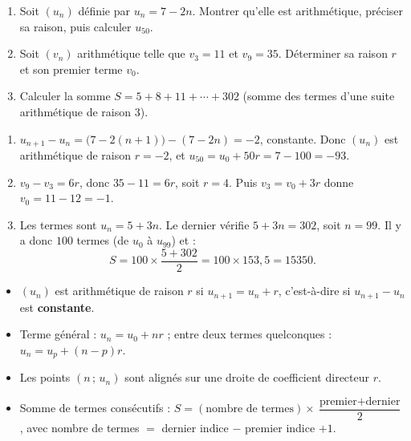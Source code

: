 \documentclass[11pt]{article}
\begin{document}
\begin{exercice}
\begin{enumerate}
\item Soit $(u_n)$ définie par $u_n = 7 - 2n$. Montrer qu'elle est arithmétique, préciser sa raison, puis calculer $u_{50}$.
\item Soit $(v_n)$ arithmétique telle que $v_3 = 11$ et $v_9 = 35$. Déterminer sa raison $r$ et son premier terme $v_0$.
\item Calculer la somme $S = 5 + 8 + 11 + \cdots + 302$ (somme des termes d'une suite arithmétique de raison $3$).
\end{enumerate}
\end{exercice}

\begin{corrige}
\begin{enumerate}
\item $u_{n+1} - u_n = \bigl(7 - 2(n+1)\bigr) - (7 - 2n) = -2$, constante. Donc $(u_n)$ est arithmétique de raison $r = -2$, et $u_{50} = u_0 + 50r = 7 - 100 = -93$.
\item $v_9 - v_3 = 6r$, donc $35 - 11 = 6r$, soit $r = 4$. Puis $v_3 = v_0 + 3r$ donne $v_0 = 11 - 12 = -1$.
\item Les termes sont $u_n = 5 + 3n$. Le dernier vérifie $5 + 3n = 302$, soit $n = 99$. Il y a donc $100$ termes (de $u_0$ à $u_{99}$) et :
\[ S = 100 \times \frac{5 + 302}{2} = 100 \times 153{,}5 = 15350. \]
\end{enumerate}
\end{corrige}

\begin{aretenir}
\begin{itemize}
\item $(u_n)$ est arithmétique de raison $r$ si $u_{n+1} = u_n + r$, c'est-à-dire si $u_{n+1} - u_n$ est \textbf{constante}.
\item Terme général : $u_n = u_0 + nr$ ; entre deux termes quelconques : $u_n = u_p + (n-p)r$.
\item Les points $(n\,;\,u_n)$ sont alignés sur une droite de coefficient directeur $r$.
\item Somme de termes consécutifs : $S = (\text{nombre de termes}) \times \dfrac{\text{premier} + \text{dernier}}{2}$, avec nombre de termes $=$ dernier indice $-$ premier indice $+1$.
\end{itemize}
\end{aretenir}
\end{document}
